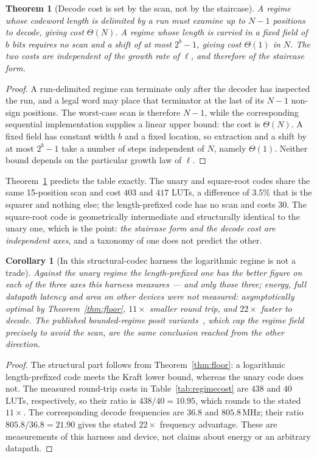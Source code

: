 \documentclass[11pt]{article}
\newtheorem{theorem}{Theorem}
\newtheorem{corollary}{Corollary}
\theoremstyle{definition}
\begin{document}
\begin{theorem}[Decode cost is set by the scan, not by the staircase]
\label{thm:scan}
A regime whose codeword length is delimited by a run must examine up to $N-1$
positions to decode, giving cost $\Theta(N)$. A regime whose length is carried in
a fixed field of $b$ bits requires no scan and a shift of at most $2^{b}-1$,
giving cost $\Theta(1)$ in $N$. The two costs are independent of the growth rate
of $\ell$, and therefore of the staircase form.
\end{theorem}
\begin{proof}
A run-delimited regime can terminate only after the decoder has inspected the
run, and a legal word may place that terminator at the last of its $N-1$
non-sign positions.  The worst-case scan is therefore $N-1$, while the
corresponding sequential implementation supplies a linear upper bound: the
cost is $\Theta(N)$.  A fixed field has constant width $b$ and a fixed
location, so extraction and a shift by at most $2^b-1$ take a number of steps
independent of $N$, namely $\Theta(1)$.  Neither bound depends on the
particular growth law of $\ell$.
\end{proof}

Theorem~\ref{thm:scan} predicts the table exactly. The unary and square-root codes
share the same 15-position scan and cost $403$ and $417$ LUTs, a difference of
$3.5\%$ that is the squarer and nothing else; the length-prefixed code has no scan
and costs $30$. The square-root code is geometrically intermediate and structurally
identical to the unary one, which is the point: \emph{the staircase form and the
decode cost are independent axes}, and a taxonomy of one does not predict the
other.

\begin{corollary}[In this structural-codec harness the logarithmic regime is not
a trade]
\label{cor:takumwins}
Against the unary regime the length-prefixed one has the better figure on each of
the three axes this harness measures --- and only those three; energy, full
datapath latency and area on other devices were not measured:
asymptotically optimal by Theorem~\ref{thm:floor}, $11\times$ smaller round trip,
and $22\times$ faster to decode. The published bounded-regime posit
variants~\cite{positgap}, which cap the regime field precisely to avoid the scan,
are the same conclusion reached from the other direction.
\end{corollary}
\begin{proof}
The structural part follows from Theorem~\ref{thm:floor}: a logarithmic
length-prefixed code meets the Kraft lower bound, whereas the unary code does
not.  The measured round-trip costs in Table~\ref{tab:regimecost} are
$438$ and $40$ LUTs, respectively, so their ratio is
$438/40=10.95$, which rounds to the stated $11\times$.  The corresponding
decode frequencies are $36.8$ and $805.8$\,MHz; their ratio
$805.8/36.8=21.90$ gives the stated $22\times$ frequency advantage.  These
are measurements of this harness and device, not claims about energy or an
arbitrary datapath.
\end{proof}
\end{document}
